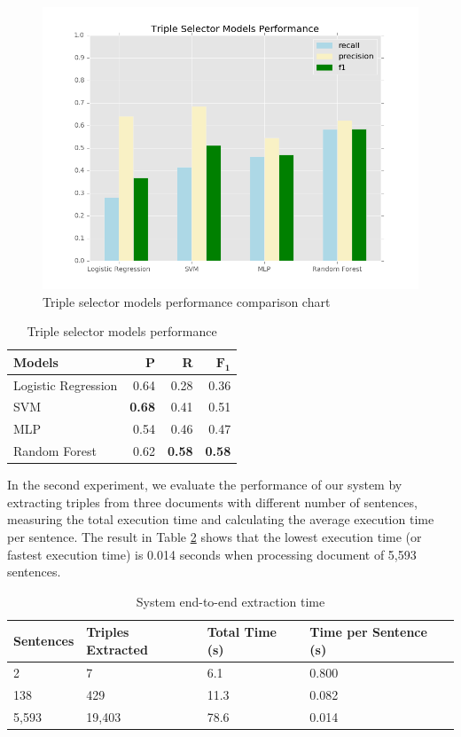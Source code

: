 \documentclass[conference,compsoc,12pt]{IEEEtran}
\begin{document}
\begin{figure}
\includegraphics[scale=0.4]{../images/models_performance.png}
\caption{Triple selector models performance comparison chart}
\label{fig_models_performance}
\end{figure}

\begin{table}[!t]
\renewcommand{\arraystretch}{1.5}
\caption{Triple selector models performance}
\label{table_models_performance}
\centering
\begin{tabular}{l r r r}
\hline
\textbf{Models} & \textbf{P} & \textbf{R} & $\mathbf{F_1}$ \\
\hline
Logistic Regression & 0.64 & 0.28 & 0.36 \\
SVM & \textbf{0.68} & 0.41 & 0.51 \\
MLP & 0.54 & 0.46 & 0.47 \\
Random Forest & 0.62 & \textbf{0.58} & \textbf{0.58} \\
\hline
\end{tabular}
\end{table}

In the second experiment, we evaluate the performance of our system by extracting triples from three documents with different number of sentences, measuring the total execution time and calculating the average execution time per sentence. The result in Table \ref{table_system_extraction_time} shows that the lowest execution time (or fastest execution time) is 0.014 seconds when processing document of 5,593 sentences.

\begin{table}[!t]
	\renewcommand{\arraystretch}{1.5}
	\caption{System end-to-end extraction time}
	\label{table_system_extraction_time}
	\centering
	\begin{tabular}{l p{1.2cm} p{1.2cm} p{1.2cm}}
		\hline
		\textbf{Sentences} & \textbf{Triples Extracted} & \textbf{Total Time (s)} & \textbf{Time per Sentence (s)} \\
		\hline
		2 & 7 & 6.1 & 0.800 \\
		138 & 429 & 11.3 & 0.082 \\
		5,593 & 19,403 & 78.6 & 0.014 \\
		\hline
	\end{tabular}
\end{table}
\end{document}
